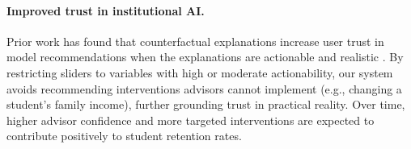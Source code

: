 \documentclass[11pt]{article}
\begin{document}
\paragraph{Improved trust in institutional AI.} Prior work has found that counterfactual explanations increase user trust in model recommendations when the explanations are actionable and realistic \cite{afrin2023,tsiakmaki2021}. By restricting sliders to variables with high or moderate actionability, our system avoids recommending interventions advisors cannot implement (e.g., changing a student's family income), further grounding trust in practical reality. Over time, higher advisor confidence and more targeted interventions are expected to contribute positively to student retention rates.


\end{document}
